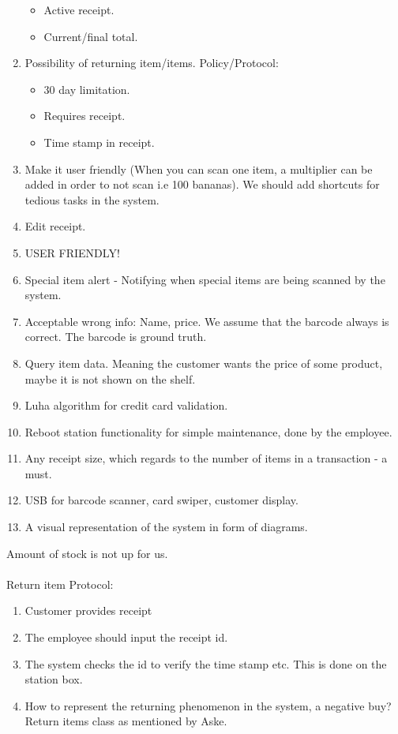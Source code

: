 \documentclass{article}
\begin{document}
\begin{enumerate}
		\begin{itemize}
			\item Active receipt.
			\item Current/final total.
		\end{itemize}
	\item Possibility of returning item/items. Policy/Protocol:
		\begin{itemize}
			\item 30 day limitation.
			\item Requires receipt.
			\item Time stamp in receipt.
		\end{itemize}
	\item Make it user friendly (When you can scan one item, a multiplier can be added
		in order to not scan i.e 100 bananas). We should add shortcuts for tedious 
		tasks in the system.
	\item Edit receipt.
	\item USER FRIENDLY!
	\item Special item alert - Notifying when special items are being scanned by the system.
	\item Acceptable wrong info: Name, price. We assume that the barcode always is correct. The barcode is ground truth.
	\item Query item data. Meaning the customer wants the price of some product, maybe it is not shown on the shelf.
	\item Luha algorithm for credit card validation.
	\item Reboot station functionality for simple maintenance, done by the employee.
	\item Any receipt size, which regards to the number of items in a transaction - a must.
	\item USB for barcode scanner, card swiper, customer display.
	\item A visual representation of the system in form of diagrams.
\end{enumerate}

Amount of stock is not up for us.
\\ \\

Return item Protocol:
\begin{enumerate}
	\item Customer provides receipt
	\item The employee should input the receipt id. 
	\item The system checks the id to verify the time stamp etc. This is done on the
		station box.
	\item How to represent the returning phenomenon in the system,
		a negative buy? Return items class as mentioned by Aske.
\end{enumerate}
\end{document}
